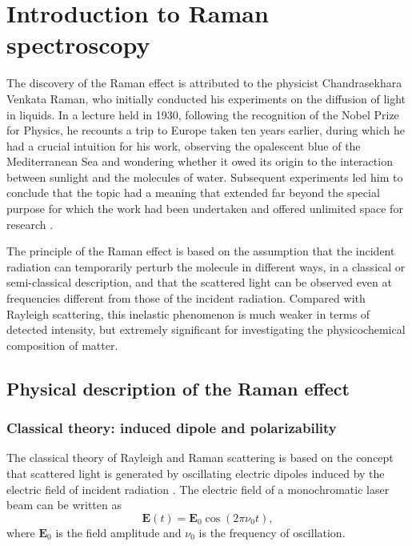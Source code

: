 \chapter{Introduction to Raman spectroscopy}
\label{ch:introduction}

The discovery of the Raman effect is attributed to the physicist Chandrasekhara Venkata Raman, who initially conducted his experiments on the diffusion of light in liquids. In a lecture held in 1930, following the recognition of the Nobel Prize for Physics, he recounts a trip to Europe taken ten years earlier, during which he had a crucial intuition for his work, observing the opalescent blue of the Mediterranean Sea and wondering whether it owed its origin to the interaction between sunlight and the molecules of water. Subsequent experiments led him to conclude that the topic had a meaning that extended far beyond the special purpose for which the work had been undertaken and offered unlimited space for research \cite{raman1930molecular}.

The principle of the Raman effect is based on the assumption that the incident radiation can temporarily perturb the molecule in different ways, in a classical or semi-classical description, and that the scattered light can be observed even at frequencies different from those of the incident radiation. Compared with Rayleigh scattering, this inelastic phenomenon is much weaker in terms of detected intensity, but extremely significant for investigating the physicochemical composition of matter.


\section{Physical description of the Raman effect}
\label{sec:theory_raman_effect}

\subsection{Classical theory: induced dipole and polarizability}
\label{subsec:classical_raman}


The classical theory of Rayleigh and Raman scattering is based on the concept that scattered light is generated by
oscillating electric dipoles induced by the electric field of incident radiation \cite{keresztury2002raman}. 
The electric field of a monochromatic laser beam can be written as
\begin{equation}
    \mathbf{E}(t) = \mathbf{E}_0 \cos(2\pi \nu_0 t),
    \label{eq:incident_field}
\end{equation}
where \(\mathbf{E}_0\) is the field amplitude and \(\nu_0\) is the frequency of oscillation.


